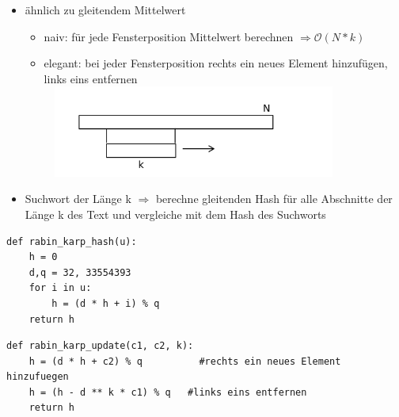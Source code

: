 \documentclass[11pt, fleqn]{scrreprt}
\newcommand{\bigO}[0]{\mathcal{O}}
\begin{document}
\begin{itemize}
    \item ähnlich zu gleitendem Mittelwert
    \begin{itemize}
        \item naiv: für jede Fensterposition Mittelwert berechnen $\Rightarrow \bigO{}(N*k)$
        \item elegant: bei jeder Fensterposition rechts ein neues Element hinzufügen, links eins entfernen\\
        \includegraphics[width=10cm,height=3cm,keepaspectratio]{./Pictures/schiebeArray.png}\\
    \end{itemize}
    \item Suchwort der Länge k $\Rightarrow$ berechne gleitenden Hash für alle Abschnitte der Länge k des Text und vergleiche mit dem Hash des Suchworts
\end{itemize}
\begin{verbatim}
def rabin_karp_hash(u):
    h = 0
    d,q = 32, 33554393
    for i in u:
        h = (d * h + i) % q
    return h
\end{verbatim}

\begin{verbatim}
def rabin_karp_update(c1, c2, k):
    h = (d * h + c2) % q          #rechts ein neues Element hinzufuegen
    h = (h - d ** k * c1) % q   #links eins entfernen
    return h
\end{verbatim}
\end{document}
